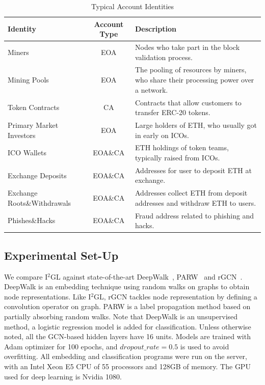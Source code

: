 \begin{table}[t]
\caption{Typical Account Identities}
\begin{center}
\begin{tabular}{|p{2.1cm}|c|p{3.9cm}|}
\hline
\textbf{Identity} & \textbf{Account Type}& \textbf{Description} \\
\hline
Miners & EOA & Nodes who take part in the block validation process. \\ \hline
Mining Pools & EOA & The pooling of resources by miners, who share their processing power over a network.\\ \hline
Token Contracts & CA & Contracts that allow customers to transfer ERC-20 tokens. \\ \hline
Primary Market Investors & EOA & Large holders of ETH, who usually got in early on ICOs. \\ \hline
ICO Wallets & EOA\&CA & ETH holdings of token teams, typically raised from ICOs. \\ \hline
Exchange Deposits & EOA\&CA & Addresses for user to deposit ETH at exchange. \\ \hline
Exchange Roots\&Withdrawals & EOA\&CA & Addresses collect ETH from deposit addresses and withdraw ETH to users. \\ \hline
Phishes\&Hacks & EOA\&CA & Fraud address related to phishing and hacks. \\ \hline
\end{tabular}
\label{table:identity}
\end{center}
\end{table}





\subsection{Experimental Set-Up}
We compare I$^2$GL against state-of-the-art DeepWalk~\cite{perozzi2014deepwalk}, PARW~\cite{wu2012learning} and rGCN~\cite{schlichtkrull2018modeling}. DeepWalk is an embedding technique using random walks on graphs to obtain node representations. Like I$^2$GL, rGCN tackles node representation by defining a convolution operator on graph. PARW is a label propagation method based on partially absorbing random walks. Note that DeepWalk is an unsupervised method, a logistic regression model is added for classification. Unless otherwise noted, all the GCN-based hidden layers have 16 units. Models are trained with Adam optimizer for 100 epochs, and $dropout\_rate=0.5$ is used to avoid overfitting. All embedding and classification programs were run on the server, with an Intel Xeon E5 CPU of 55 processors and 128GB of memory. The GPU used for deep learning is Nvidia 1080.

